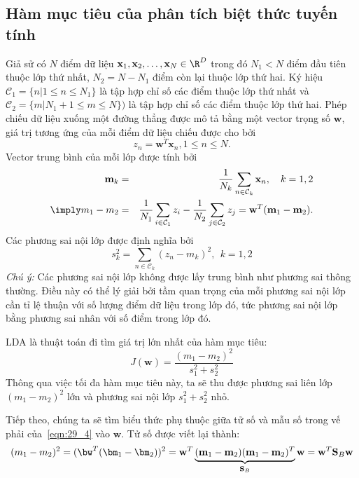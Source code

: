 \subsection{Hàm mục tiêu của phân tích biệt thức tuyến tính}
Giả sử có $N$ điểm dữ liệu $\mathbf{x}_1, \mathbf{x}_2, \dots,
\mathbf{x}_N \in \R^D$ trong đó $N_1 < N$ điểm đầu tiên thuộc lớp thứ nhất,
$N_2 = N - N_1$ điểm còn lại thuộc lớp thứ hai. Ký hiệu $\mathcal{C}_1 = \{n | 1
\leq n \leq N_1\}$ là tập hợp chỉ số các điểm thuộc lớp thứ nhất và
$\mathcal{C}_2 = \{m| N_1 + 1 \leq m \leq N\})$ là tập hợp  chỉ số các
điểm thuộc lớp thứ hai. Phép chiếu dữ liệu xuống một đường thẳng được mô
tả bằng một vector trọng số $\mathbf{w}$, giá trị tương ứng của mỗi điểm dữ liệu
chiếu được cho bởi
\begin{equation}
z_n = \mathbf{w}^T\mathbf{x}_n, 1 \leq n \leq N.
\end{equation}
Vector trung bình của mỗi lớp được tính bởi
\begin{eqnarray}
\label{eqn:29_1}
\mathbf{m}_k &=& \frac{1}{N_k}\sum_{n \in \mathcal{C}_k}\mathbf{x}_n,~~~ k = 1,
2 \\
\label{eqn:29_2}
\imply m_1 - m_2 &=& \frac{1}{N_1}\sum_{i \in \mathcal{C}_1}z_i -
\frac{1}{N_2}\sum_{j \in \mathcal{C}_2}z_j =  \mathbf{w}^T(\mathbf{m}_1 - \mathbf{m}_2).
\end{eqnarray}
Các phương sai nội lớp được định nghĩa bởi
\begin{equation}
\label{eqn:29_3}
s_k^2 = \sum_{n \in \mathcal{C}_k} (z_n - m_k)^2, ~~ k = 1, 2
\end{equation}
\textit{Chú ý:} Các phương sai nội lớp không được lấy trung bình như
phương sai thông thường. Điều này có thể lý giải bởi tầm quan trọng của mỗi
phương sai nội lớp cần tỉ lệ thuận với số lượng điểm dữ liệu trong lớp đó,
tức phương sai nội lớp bằng phương sai nhân với số điểm trong lớp đó.

LDA là thuật toán đi tìm giá trị lớn nhất của hàm mục tiêu:
\begin{equation}
\label{eqn:29_4}
J(\mathbf{w}) = \frac{(m_1 - m_2)^2}{s_1^2 + s_2^2}
\end{equation}
Thông qua việc tối đa hàm mục tiêu này, ta sẽ thu được phương sai liên lớp $(m_1 - m_2)^2$ lớn và phương sai nội lớp $s_1^2 + s_2^2$
nhỏ.

Tiếp theo, chúng ta sẽ tìm biểu thức phụ thuộc giữa tử số và mẫu số trong vế
phải của~\eqref{eqn:29_4} vào $\mathbf{w}$. Tử số được viết lại thành:
\begin{eqnarray*}
\label{eqn:29_5}
(m_1 - m_2)^2 = (\bw^T(\bm_1 - \bm_2))^2 = \mathbf{w}^T
\underbrace{(\mathbf{m}_1 - \mathbf{m}_2)(\mathbf{m}_1 - \mathbf{m}_2)^T}_{\mathbf{S}_B} \mathbf{w} = \mathbf{w}^T\mathbf{S}_B \mathbf{w}
\end{eqnarray*}

